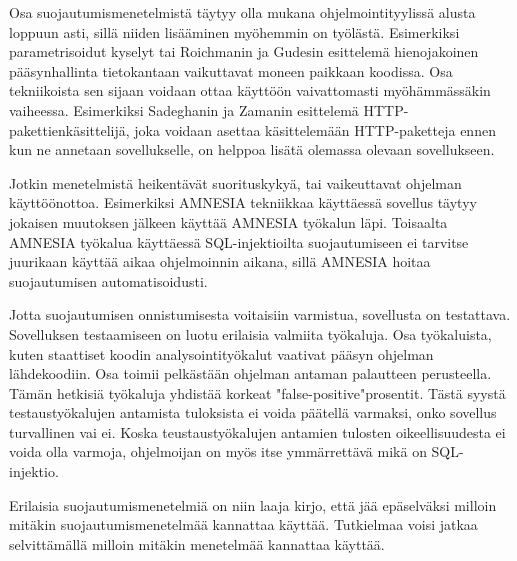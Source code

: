 \documentclass[finnish]{tktltiki2}
\theoremstyle{definition}
\theoremstyle{remark}
\begin{document}
	Osa suojautumismenetelmistä täytyy olla mukana ohjelmointityylissä alusta loppuun asti, sillä niiden lisääminen myöhemmin on työlästä. Esimerkiksi parametrisoidut kyselyt tai Roichmanin ja Gudesin esittelemä hienojakoinen pääsynhallinta tietokantaan vaikuttavat moneen paikkaan koodissa. Osa tekniikoista sen sijaan voidaan ottaa käyttöön vaivattomasti myöhämmässäkin vaiheessa. Esimerkiksi Sadeghanin ja Zamanin esittelemä HTTP-pakettienkäsittelijä, joka voidaan asettaa käsittelemään HTTP-paketteja ennen kun ne annetaan sovellukselle, on helppoa lisätä olemassa olevaan sovellukseen. 
	
	Jotkin menetelmistä heikentävät suorituskykyä, tai vaikeuttavat ohjelman käyttöönottoa. Esimerkiksi AMNESIA tekniikkaa käyttäessä sovellus täytyy jokaisen muutoksen jälkeen käyttää AMNESIA työkalun läpi. Toisaalta AMNESIA työkalua käyttäessä SQL-injektioilta suojautumiseen ei tarvitse juurikaan käyttää aikaa ohjelmoinnin aikana, sillä AMNESIA hoitaa suojautumisen automatisoidusti.
	
	Jotta suojautumisen onnistumisesta voitaisiin varmistua, sovellusta on testattava. Sovelluksen testaamiseen on luotu erilaisia valmiita työkaluja. Osa työkaluista, kuten staattiset koodin analysointityökalut vaativat pääsyn ohjelman lähdekoodiin. Osa toimii pelkästään ohjelman antaman palautteen perusteella. Tämän hetkisiä työkaluja yhdistää korkeat "false-positive"\space prosentit. Tästä syystä testaustyökalujen antamista tuloksista ei voida päätellä varmaksi, onko sovellus turvallinen vai ei. Koska teustaustyökalujen antamien tulosten oikeellisuudesta ei voida olla varmoja, ohjelmoijan on myös itse ymmärrettävä mikä on SQL-injektio.
	
	 Erilaisia suojautumismenetelmiä on niin laaja kirjo, että jää epäselväksi milloin mitäkin suojautumismenetelmää kannattaa käyttää. Tutkielmaa voisi jatkaa selvittämällä milloin mitäkin menetelmää kannattaa käyttää.
	
	



	
	
	
	
	
	
	
	
	
\end{document}
